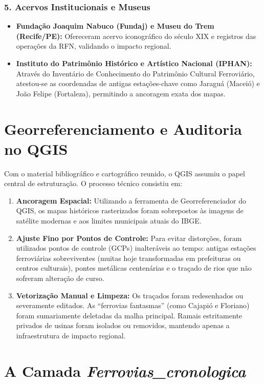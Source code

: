 \documentclass[11pt, a4paper]{article}
\begin{document}
\subsubsection*{5. Acervos Institucionais e Museus}
\begin{itemize}
    \item \textbf{Fundação Joaquim Nabuco (Fundaj) e Museu do Trem (Recife/PE):} Ofereceram acervo iconográfico do século XIX e registros das operações da RFN, validando o impacto regional.
    \item \textbf{Instituto do Patrimônio Histórico e Artístico Nacional (IPHAN):} Através do Inventário de Conhecimento do Patrimônio Cultural Ferroviário, atestou-se as coordenadas de antigas estações-chave como Jaraguá (Maceió) e João Felipe (Fortaleza), permitindo a ancoragem exata dos mapas.
\end{itemize}

\section{Georreferenciamento e Auditoria no QGIS}

Com o material bibliográfico e cartográfico reunido, o QGIS assumiu o papel central de estruturação. O processo técnico consistiu em:

\begin{enumerate}
    \item \textbf{Ancoragem Espacial:} Utilizando a ferramenta de Georreferenciador do QGIS, os mapas históricos rasterizados foram sobrepostos às imagens de satélite modernas e aos limites municipais atuais do IBGE.
    \item \textbf{Ajuste Fino por Pontos de Controle:} Para evitar distorções, foram utilizados pontos de controle (GCPs) inalteráveis ao tempo: antigas estações ferroviárias sobreviventes (muitas hoje transformadas em prefeituras ou centros culturais), pontes metálicas centenárias e o traçado de rios que não sofreram alteração de curso.
    \item \textbf{Vetorização Manual e Limpeza:} Os traçados foram redesenhados ou severamente editados. As ``ferrovias fantasmas'' (como Cajapió e Floriano) foram sumariamente deletadas da malha principal. Ramais estritamente privados de usinas foram isolados ou removidos, mantendo apenas a infraestrutura de impacto regional.
\end{enumerate}

\section{A Camada \textit{Ferrovias\_cronologica}}
\end{document}
